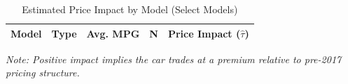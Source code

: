 
\begin{table}[ht]
    \centering
    \caption{Estimated Price Impact by Model (Select Models)}
    \label{tab:hetero_impact}
    \begin{tabular}{lcccc}
        \toprule
        Model & Type & Avg. MPG & N & Price Impact ($\hat{\tau}$) \\
        \midrule
        \bottomrule
    \end{tabular}
    \small \textit{Note: Positive impact implies the car trades at a premium relative to pre-2017 pricing structure.}
\end{table}
